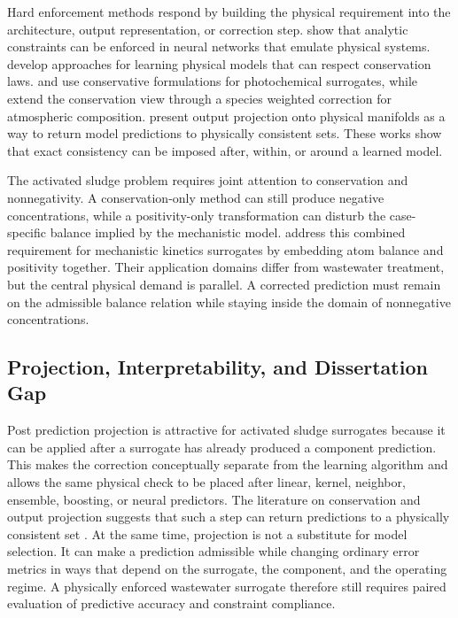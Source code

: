 \documentclass[12pt, twoside]{book}
\begin{document}
Hard enforcement methods respond by building the physical requirement into the architecture, output
representation, or correction step. \citet{Beucler2021} show that analytic constraints can be enforced in
neural networks that emulate physical systems. \citet{Hansen2024} develop approaches for learning physical
models that can respect conservation laws. \citet{SturmWexler2020} and \citet{SturmWexler2022} use
conservative formulations for photochemical surrogates, while \citet{SturmSilva2024} extend the conservation
view through a species weighted correction for atmospheric composition. \citet{Valente2025} present output
projection onto physical manifolds as a way to return model predictions to physically consistent sets. These
works show that exact consistency can be imposed after, within, or around a learned model.

The activated sludge problem requires joint attention to conservation and nonnegativity. A conservation-only
method can still produce negative concentrations, while a positivity-only transformation can disturb the
case-specific balance implied by the mechanistic model. \citet{KircherVotsmeier2025} address this combined
requirement for mechanistic kinetics surrogates by embedding atom balance and positivity together. Their
application domains differ from wastewater treatment, but the central physical demand is parallel. A corrected
prediction must remain on the admissible balance relation while staying inside the domain of nonnegative
concentrations.

\subsection{Projection, Interpretability, and Dissertation Gap}

Post prediction projection is attractive for activated sludge surrogates because it can be applied after a
surrogate has already produced a component prediction. This makes the correction conceptually separate from the
learning algorithm and allows the same physical check to be placed after linear, kernel, neighbor, ensemble,
boosting, or neural predictors. The literature on conservation and output projection suggests that such a step
can return predictions to a physically consistent set \citep{KircherVotsmeier2025,Valente2025}. At the same
time, projection is not a substitute for model selection. It can make a prediction admissible while changing
ordinary error metrics in ways that depend on the surrogate, the component, and the operating regime. A
physically enforced wastewater surrogate therefore still requires paired evaluation of predictive accuracy and
constraint compliance.
\end{document}
